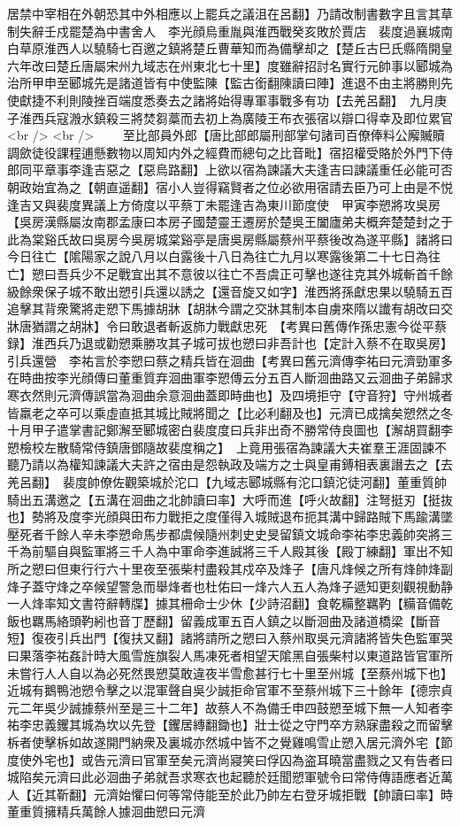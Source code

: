 居禁中宰相在外朝恐其中外相應以上罷兵之議沮在呂翻】乃請改制書數字且言其草制失辭壬戍罷楚為中書舍人　李光顔烏重胤與淮西戰癸亥敗於賈店　裴度過襄城南白草原淮西人以驍騎七百邀之鎮將楚丘曹華知而為備擊却之【楚丘古巳氏縣隋開皇六年改曰楚丘唐屬宋州九域志在州東北七十里】度雖辭招討名實行元帥事以郾城為治所甲申至郾城先是諸道皆有中使監陳【監古銜翻陳讀曰陣】進退不由主將勝則先使獻捷不利則陵挫百端度悉奏去之諸將始得專軍事戰多有功【去羌呂翻】　九月庚子淮西兵寇溵水鎮殺三將焚芻藁而去初上為廣陵王布衣張宿以辯口得幸及即位累官<br />
<br />
　　至比部員外郎【唐比部郎屬刑部掌句諸司百僚俸料公廨贓贖調歛徒役課程逋懸數物以周知内外之經費而總句之比音毗】宿招權受賂於外門下侍郎同平章事李逢吉惡之【惡烏路翻】上欲以宿為諫議大夫逢吉曰諫議重任必能可否朝政始宜為之【朝直遥翻】宿小人豈得竊賢者之位必欲用宿請去臣乃可上由是不悦逢吉又與裴度異議上方倚度以平蔡丁未罷逢吉為東川節度使　甲寅李愬將攻吳房【吳房漢縣屬汝南郡孟康曰本房子國楚靈王遷房於楚吳王闔廬弟夫概奔楚楚封之于此為棠谿氏故曰吳房今吳房城棠谿亭是唐吳房縣屬蔡州平蔡後改為遂平縣】諸將曰今日往亡【隂陽家之說八月以白露後十八日為往亡九月以寒露後第二十七日為往亡】愬曰吾兵少不足戰宜出其不意彼以往亡不吾虞正可擊也遂往克其外城斬首千餘級餘衆保子城不敢出愬引兵還以誘之【還音旋又如字】淮西將孫獻忠果以驍騎五百追擊其背衆驚將走愬下馬據胡牀【胡牀今謂之交牀其制本自虜來隋以䜟有胡改曰交牀唐猶謂之胡牀】令曰敢退者斬返斾力戰獻忠死　【考異曰舊傳作孫忠憲今從平蔡録】淮西兵乃退或勸愬乘勝攻其子城可拔也愬曰非吾計也【定計入蔡不在取吳房】引兵還營　李祐言於李愬曰蔡之精兵皆在洄曲【考異曰舊元濟傳李祐曰元濟勁軍多在時曲按李光顔傳曰董重質弃洄曲軍李愬傳云分五百人斷洄曲路又云洄曲子弟歸求寒衣然則元濟傳誤當為洄曲余意洄曲蓋即時曲也】及四境拒守【守音狩】守州城者皆羸老之卒可以乘虛直抵其城比賊將聞之【比必利翻及也】元濟已成擒矣愬然之冬十月甲子遣掌書記鄭澥至郾城密白裴度度曰兵非出奇不勝常侍良圖也【澥胡買翻李愬檢校左散騎常侍鎮唐鄧隨故裴度稱之】　上竟用張宿為諫議大夫崔羣王涯固諫不聽乃請以為權知諫議大夫許之宿由是怨執政及端方之士與皇甫鎛相表裏譖去之【去羌呂翻】　裴度帥僚佐觀築城於沱口【九域志郾城縣有沱口鎮沱徒河翻】董重質帥騎出五溝邀之【五溝在洄曲之北帥讀曰率】大呼而進【呼火故翻】注弩挺刃【挺抜也】勢將及度李光顔與田布力戰拒之度僅得入城賊退布扼其溝中歸路賊下馬踰溝墜壓死者千餘人辛未李愬命馬步都虞候隨州刺史史旻留鎮文城命李祐李忠義帥突將三千為前驅自與監軍將三千人為中軍命李進誠將三千人殿其後【殿丁練翻】軍出不知所之愬曰但東行行六十里夜至張柴村盡殺其戍卒及烽子【唐凡烽候之所有烽帥烽副烽子蓋守烽之卒候望警急而舉烽者也杜佑曰一烽六人五人為烽子遞知更刻觀視動静一人烽率知文書符辭轉牒】據其柵命士少休【少詩沼翻】食乾糒整羈靮【糒音備乾飯也羈馬絡頭靮紖也音丁歷翻】留義成軍五百人鎮之以斷洄曲及諸道橋梁【斷音短】復夜引兵出門【復扶又翻】諸將請所之愬曰入蔡州取吳元濟諸將皆失色監軍哭曰果落李祐姦計時大風雪旌旗裂人馬凍死者相望天隂黑自張柴村以東道路皆官軍所未嘗行人人自以為必死然畏愬莫敢違夜半雪愈甚行七十里至州城【至蔡州城下也】近城有鵝鴨池愬令擊之以混軍聲自吳少誠拒命官軍不至蔡州城下三十餘年【德宗貞元二年吳少誠據蔡州至是三十二年】故蔡人不為備壬申四鼓愬至城下無一人知者李祐李忠義钁其城為坎以先登【钁居縳翻鋤也】壯士從之守門卒方熟寐盡殺之而留擊柝者使擊柝如故遂開門納衆及裏城亦然城中皆不之覺雞鳴雪止愬入居元濟外宅【節度使外宅也】或告元濟曰官軍至矣元濟尚寢笑曰俘囚為盗耳曉當盡戮之又有告者曰城陷矣元濟曰此必洄曲子弟就吾求寒衣也起聽於廷聞愬軍號令曰常侍傳語應者近萬人【近其靳翻】元濟始懼曰何等常侍能至於此乃帥左右登牙城拒戰【帥讀曰率】時董重質擁精兵萬餘人據洄曲愬曰元濟